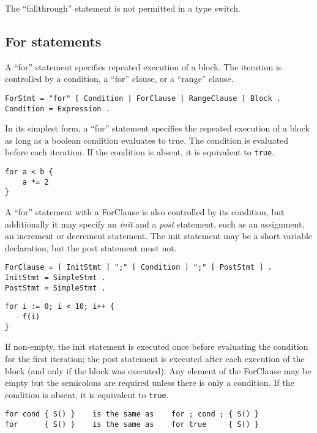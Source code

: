 {The ``fallthrough'' statement is not permitted in a type switch.

\subsection*{For statements}

A ``for'' statement specifies repeated execution of a block. The
iteration is controlled by a condition, a ``for'' clause, or a ``range''
clause.

\begin{Verbatim}[frame=single]
ForStmt = "for" [ Condition | ForClause | RangeClause ] Block .
Condition = Expression .
\end{Verbatim}

In its simplest form, a ``for'' statement specifies the repeated
execution of a block as long as a boolean condition evaluates to true.
The condition is evaluated before each iteration. If the condition is
absent, it is equivalent to \texttt{true}.

\begin{Verbatim}[frame=single]
for a < b {
    a *= 2
}
\end{Verbatim}

A ``for'' statement with a ForClause is also controlled by its
condition, but additionally it may specify an \emph{init} and a
\emph{post} statement, such as an assignment, an increment or decrement
statement. The init statement may be a
short variable declaration,
but the post statement must not.

\begin{Verbatim}[frame=single]
ForClause = [ InitStmt ] ";" [ Condition ] ";" [ PostStmt ] .
InitStmt = SimpleStmt .
PostStmt = SimpleStmt .
\end{Verbatim}

\begin{Verbatim}[frame=single]
for i := 0; i < 10; i++ {
    f(i)
}
\end{Verbatim}

If non-empty, the init statement is executed once before evaluating the
condition for the first iteration; the post statement is executed after
each execution of the block (and only if the block was executed). Any
element of the ForClause may be empty but the
semicolons are required unless there is only a
condition. If the condition is absent, it is equivalent to
\texttt{true}.

\begin{Verbatim}[frame=single]
for cond { S() }    is the same as    for ; cond ; { S() }
for      { S() }    is the same as    for true     { S() }
\end{Verbatim}

}
